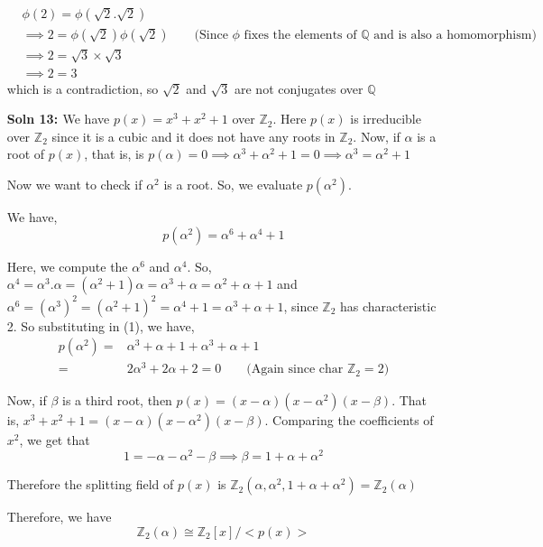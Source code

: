 \documentclass[12pt]{article}
\begin{document}
\begin{enumerate}
    \[
    \begin{aligned}
        &\phi(2)=\phi(\sqrt2.\sqrt2)\\
        &\implies2=\phi(\sqrt2)\phi(\sqrt2) \qquad \text{(Since $\phi$ fixes the elements of $\mathbb{Q}$ and is also a homomorphism)}\\
        &\implies2=\sqrt3\times\sqrt3\\
        &\implies2=3
    \end{aligned}
    \]
    which is a contradiction, so $\sqrt2$ and $\sqrt3$ are not conjugates over $\mathbb{Q}$
    \item[\bf{Soln 13: }] We have $p(x)=x^3+x^2+1$ over $\mathbb{Z}_2$. Here $p(x)$ is irreducible over $\mathbb{Z}_2$ since it is a cubic and it does not have any roots in $\mathbb{Z}_2$. Now, if $\alpha$ is a root of $p(x)$, that is, is $p(\alpha)=0\implies \alpha^3+\alpha^2+1=0\implies\alpha ^3=\alpha^2+1$


    Now we want to check if $\alpha^2$ is a root. So, we evaluate $p(\alpha^2).$

    We have,
    \begin{equation*}
        p(\alpha^2)=\alpha^6+\alpha^4+1 \tag{1}
    \end{equation*}

    Here, we compute the $\alpha^6$ and $\alpha^4$. So, $\alpha^4=\alpha^3.\alpha=(\alpha^2+1)\alpha=\alpha^3+\alpha=\alpha^2+\alpha+1$ and $\alpha^6=(\alpha^3)^2=(\alpha^2+1)^2=\alpha^4+1=\alpha^3+\alpha+1$, since $\mathbb{Z}_2$ has characteristic 2. So substituting in (1), we have,
    \[
    \begin{aligned}
        p(\alpha^2)=&\alpha^3+\alpha+1+\alpha^3+\alpha+1\\
        =&2\alpha^3+2\alpha+2=0 \qquad \text{(Again since char $\mathbb{Z}_2=2$)}
\end{aligned}
    \]

    Now, if $\beta$ is a third root, then $p(x)=(x-\alpha)(x-\alpha^2)(x-\beta)$. That is, $x^3+x^2+1=(x-\alpha)(x-\alpha^2)(x-\beta)$. Comparing the coefficients of $x^2$, we get that 
    \[
    1=-\alpha-\alpha^2-\beta\implies\beta=1+\alpha+\alpha^2
    \] 

    Therefore the splitting field of $p(x)$ is $\mathbb{Z}_2(\alpha,\alpha^2,1+\alpha+\alpha^2)=\mathbb{Z}_2(\alpha)$

    Therefore, we have
    \[
    \mathbb{Z}_2(\alpha) \cong \mathbb{Z}_2[x]/<p(x)>
    \]
\end{enumerate}
\end{document}

